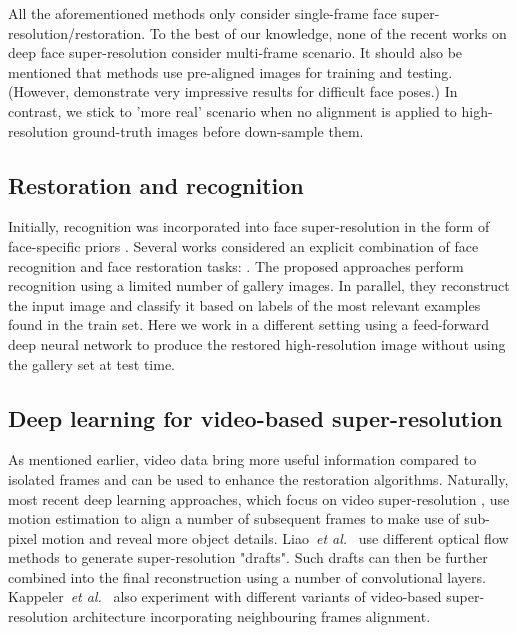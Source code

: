 All the aforementioned methods only consider single-frame face super-resolution/restoration. To the best of our knowledge, none of the recent works on deep face super-resolution consider multi-frame scenario. It should also be mentioned that methods \cite{TuzelTH16,xu2017learning,huang2017wavelet} use pre-aligned images for training and testing. (However, \cite{huang2017wavelet} demonstrate very impressive results for difficult face poses.) In contrast, we stick to 'more real' scenario when no alignment is applied to high-resolution ground-truth images before down-sample them. 


\subsection{Restoration and recognition}


Initially, recognition was incorporated into face super-resolution in the form of face-specific priors \cite{baker2002limits, LiuSF07}. Several works considered an explicit combination of face recognition and face restoration tasks: \cite{Hennings-YeomansBK08, ZhangYZNH11}.
The proposed approaches perform recognition using a limited number of gallery images. In parallel, they reconstruct the input image and classify it based on labels of the most relevant examples found in the train set. Here we work in a different setting using a feed-forward deep neural network to produce the restored high-resolution image without using the gallery set at test time.

\subsection{Deep learning for video-based super-resolution}
As mentioned earlier, video data bring more useful information compared to isolated frames and can be used to enhance the restoration algorithms. Naturally, most recent deep learning approaches, which focus on video super-resolution \cite{LiaoTLMJ15, SongDQ16, TaoGLWJ17}, use motion estimation to align a number of subsequent frames to make use of sub-pixel motion and reveal more object details. Liao~\emph{et al.}~\cite{LiaoTLMJ15} use different optical flow methods to generate super-resolution "drafts". Such drafts can then be further combined into the final reconstruction using a number of convolutional layers. Kappeler~\emph{et al.}~\cite{KappelerYDK16} also experiment with different variants of video-based super-resolution architecture incorporating neighbouring frames alignment. 

